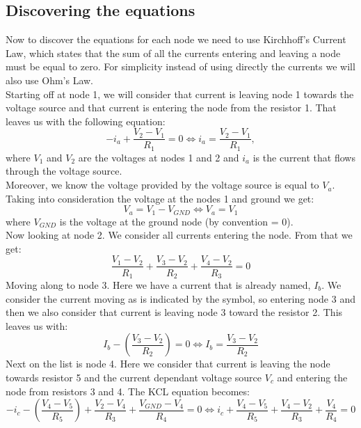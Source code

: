 \subsection{Discovering the equations}
Now to discover the equations for each node we need to use Kirchhoff’s Current Law, which states that the sum of all the currents entering and leaving a node must be equal to zero. For simplicity instead of using directly the currents we will also use Ohm's Law. \\
Starting off at node 1, we will consider that current is leaving node 1 towards the voltage source and that current is entering the node from the resistor 1. That leaves us with the following equation:
\begin{equation}
     -i_{a}+\frac{V_{2}-V_{1}}{R_{1}}=0 \Leftrightarrow i_{a}=\frac{V_{2}-V_{1}}{R_{1}},
\end{equation}
where $V_{1}$ and $V_{2}$ are the voltages at nodes 1 and 2 and $i_{a}$ is the current that flows through the voltage source. \\
Moreover, we know the voltage provided by the voltage source is equal to $V_{a}$. Taking into consideration the voltage at the nodes 1 and ground we get:
\begin{equation}
    V_{a}=V_{1}-V_{GND} \Leftrightarrow V_{a}=V_{1}
\end{equation}
where $V_{GND}$ is the voltage at the ground node (by convention = 0).\\
Now looking at node 2. We consider all currents entering the node. From that we get:
\begin{equation}
  \frac{V_{1}-V_{2}}{R_{1}} +\frac{V_{3}-V_{2}}{R_{2}}+\frac{V_{4}-V_{2}}{R_{3}}=0
\end{equation}
Moving along to node 3. Here we have a current that is already named, $I_b$. We consider the current moving as is indicated by the symbol, so entering node 3 and then we also consider that current is leaving node 3 toward the resistor 2. This leaves us with:
\begin{equation}
    I_{b}-\left(\frac{V_{3}-V_{2}}{R_{2}}\right)=0 \Leftrightarrow I_{b}=\frac{V_{3}-V_{2}}{R_{2}}
\end{equation}
Next on the list is node 4. Here we consider that current is leaving the node towards resistor 5 and the current dependant voltage source $V_{c}$ and entering the node from resistors 3 and 4. The KCL equation becomes:
\begin{equation}
    -i_{c}-\left(\frac{V_{4}-V_{5}}{R_{5}}\right)+\frac{V_{2}-V_{4}}{R_{3}}+\frac{V_{GND}-V_{4}}{R_{4}}=0 \Leftrightarrow i_{c}+\frac{V_{4}-V_{5}}{R_{5}}+\frac{V_{4}-V_{2}}{R_{3}}+\frac{V_{4}}{R_{4}}=0 
\end{equation}

